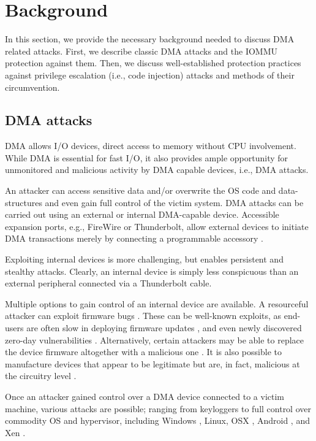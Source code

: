 \section{Background}

In this section, we provide the necessary background needed to discuss DMA related attacks. First, we describe classic DMA attacks and the IOMMU protection against them. Then, we discuss well-established protection practices against privilege escalation (i.e., code injection) attacks and methods of their circumvention.

\subsection{DMA attacks}

DMA allows I/O devices, direct access to memory \cite{oC54} without CPU involvement. While DMA is essential for fast I/O, it also provides ample opportunity for unmonitored and malicious activity by DMA capable devices, i.e., DMA attacks. 

An attacker can access sensitive data and/or overwrite the OS code and data-structures and even gain full control of the victim system. DMA attacks can be carried out using an external or internal DMA-capable device. Accessible expansion ports, e.g., FireWire or Thunderbolt, allow external devices to initiate DMA transactions merely by connecting a programmable accessory \cite{Dor04, Vol, MM, thunder}. 

Exploiting internal devices is more challenging, but enables persistent and stealthy attacks. Clearly, an internal device is simply less conspicuous than an external peripheral connected via a Thunderbolt cable.

Multiple options to gain control of an internal device are available.
A resourceful attacker can exploit firmware bugs \cite{SB12}. These can be well-known exploits, as end-users are often slow in deploying firmware updates \cite{DPVL10}, and even newly discovered zero-day vulnerabilities \cite{Ben17b}. Alternatively, certain attackers may be able to replace the device firmware altogether with a malicious one \cite{ZKB13, NL14}. It is also possible to manufacture devices that appear to be legitimate but are, in fact, malicious at the circuitry level \cite{YHD16}.

Once an attacker gained control over a DMA device connected to a victim machine, various attacks are possible; ranging from keyloggers \cite{LKV13, SB12} to full control over commodity OS and hypervisor, including Windows \cite{AD10,thunder}, Linux, OSX \cite{Fri16, thunder}, Android \cite{Ben17b}, and Xen \cite{Woj08}.

